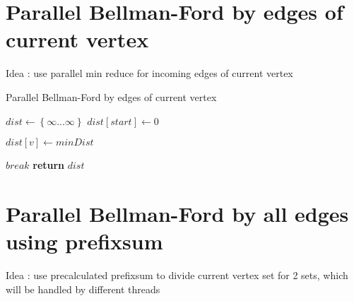 \FloatBarrier
\section{Parallel Bellman-Ford by edges of current vertex}
Idea : use parallel min reduce for incoming edges of current vertex   


\FloatBarrier
\begin{algorithm}
\caption{Parallel Bellman-Ford by edges of current vertex}\label{bf_classic_par1}
\begin{algorithmic}[1]
\State $dist\gets \left\{ {\infty ... \infty}\right\}$
\State $dist[start] \gets 0$
 
		\algrenewcommand{}
		
			\State $dist[v] \gets minDist$
		\EndIf
		\algrenewcommand{}

	\EndFor
		\State $break$
	\EndIf
\EndFor
\State \textbf{return} $dist$
\EndProcedure
\end{algorithmic}
\end{algorithm}

\FloatBarrier
\section{Parallel Bellman-Ford by all edges using prefixsum}

Idea : use precalculated prefixsum to divide current vertex set for 2 sets, which will be handled by different threads


